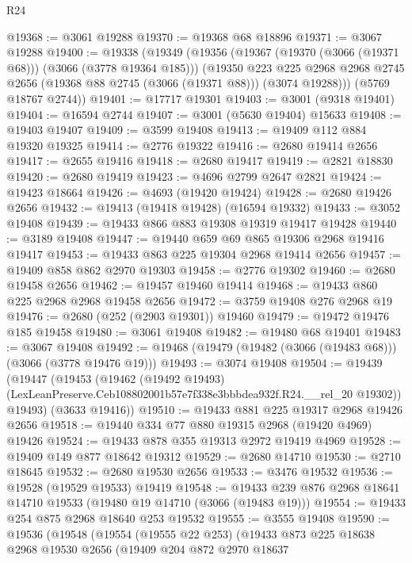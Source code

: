 \begin{lexlean}{R24}
\begin{coremodule}
@19368 := @3061 @19288
@19370 := @19368 @68 @18896
@19371 := @3067 @19288
@19400 := @19338
    (@19349
      (@19356
        (@19367 (@19370 (@3066 (@19371 @68))) (@3066 (@3778 @19364 @185)))
        (@19350
          @223
          @225
          @2968
          @2968
          @2745
          @2656
          (@19368 @88 @2745 (@3066 (@19371 @88)))
          (@3074 @19288)))
      (@5769 @18767 @2744))
@19401 := @17717 @19301
@19403 := @3001 (@9318 @19401)
@19404 := @16594 @2744
@19407 := @3001 (@5630 @19404) @15633
@19408 := @19403 @19407
@19409 := @3599 @19408
@19413 := @19409 @112 @884 @19320 @19325
@19414 := @2776 @19322
@19416 := @2680 @19414 @2656
@19417 := @2655 @19416
@19418 := @2680 @19417
@19419 := @2821 @18830
@19420 := @2680 @19419
@19423 := @4696 @2799 @2647 @2821
@19424 := @19423 @18664
@19426 := @4693 (@19420 @19424)
@19428 := @2680 @19426 @2656
@19432 := @19413 (@19418 @19428) (@16594 @19332)
@19433 := @3052 @19408
@19439 := @19433 @866 @883 @19308 @19319 @19417 @19428
@19440 := @3189 @19408
@19447 := @19440 @659 @69 @865 @19306 @2968 @19416 @19417
@19453 := @19433 @863 @225 @19304 @2968 @19414 @2656
@19457 := @19409 @858 @862 @2970 @19303
@19458 := @2776 @19302
@19460 := @2680 @19458 @2656
@19462 := @19457 @19460 @19414
@19468 := @19433 @860 @225 @2968 @2968 @19458 @2656
@19472 := @3759 @19408 @276 @2968 @19
@19476 := @2680 (@252 (@2903 @19301)) @19460
@19479 := @19472 @19476 @185 @19458
@19480 := @3061 @19408
@19482 := @19480 @68 @19401
@19483 := @3067 @19408
@19492 := @19468 (@19479 (@19482 (@3066 (@19483 @68))) (@3066 (@3778 @19476 @19)))
@19493 := @3074 @19408
@19504 := @19439
    (@19447
      (@19453
        (@19462
          (@19492 @19493)
          (LexLeanPreserve.Ceb108802001b57e7f338e3bbbdea932f.R24.__rel_20 @19302))
        @19493)
      (@3633 @19416))
@19510 := @19433 @881 @225 @19317 @2968 @19426 @2656
@19518 := @19440 @334 @77 @880 @19315 @2968 (@19420 @4969) @19426
@19524 := @19433 @878 @355 @19313 @2972 @19419 @4969
@19528 := @19409 @149 @877 @18642 @19312
@19529 := @2680 @14710
@19530 := @2710 @18645
@19532 := @2680 @19530 @2656
@19533 := @3476 @19532
@19536 := @19528 (@19529 @19533) @19419
@19548 := @19433 @239 @876 @2968 @18641 @14710 @19533 (@19480 @19 @14710 (@3066 (@19483 @19)))
@19554 := @19433 @254 @875 @2968 @18640 @253 @19532
@19555 := @3555 @19408
@19590 := @19536
    (@19548
      (@19554
        (@19555 @22 @253)
        (@19433
          @873
          @225
          @18638
          @2968
          @19530
          @2656
          (@19409
            @204
            @872
            @2970
            @18637

\end{coremodule}
\end{lexlean}
